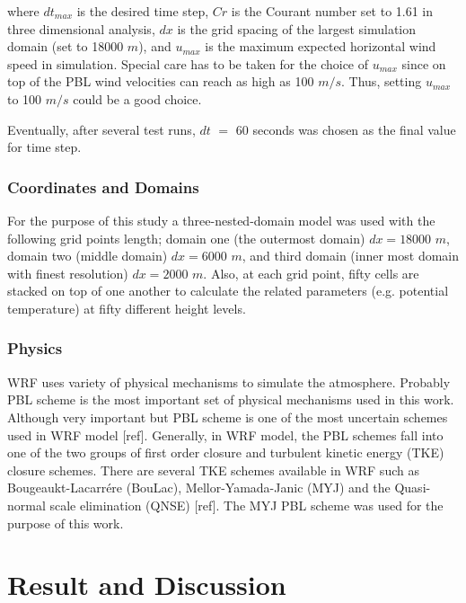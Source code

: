 \documentclass[a4paper,12pt]{article}
\numberwithin{equation}{section} %
\begin{document}
where $dt_{max}$ is the desired time step, $Cr$ is the Courant number set to 1.61 in three dimensional analysis, $dx$ is the grid spacing of the largest simulation domain (set to 18000 $m$), and $u_{max}$ is the maximum expected horizontal wind speed in simulation. Special care has to be taken for the choice of $u_{max}$ since on top of the PBL wind velocities can reach as high as 100 $m/s$. Thus, setting $u_{max}$ to 100 $m/s$ could be a good choice.

\vspace{0.25cm}

Eventually, after several test runs, $dt$ $=$ $60$ seconds was chosen as the final value for time step.

\subsubsection{Coordinates and Domains}
For the purpose of this study a three-nested-domain model was used with the following grid points length; domain one (the outermost domain) $dx = 18000$ $m$, domain two (middle domain) $dx = 6000$ $m$, and third domain (inner most domain with finest resolution) $dx = 2000$ $m$. %
Also, at each grid point, fifty cells are stacked on top of one another to calculate the related parameters (e.g. potential temperature) at fifty different height levels.

\subsubsection{Physics}

WRF uses variety of physical mechanisms to simulate the atmosphere. Probably PBL scheme is the most important set of physical mechanisms used in this work. Although very important but PBL scheme is one of the most uncertain schemes used in WRF model [ref]. Generally, in WRF model, the PBL schemes fall into one of the two groups of 	first order closure and turbulent kinetic energy (TKE) closure schemes. There are several TKE schemes available in WRF such as Bougeaukt-Lacarrére (BouLac), Mellor-Yamada-Janic (MYJ) and the Quasi-normal scale elimination (QNSE) [ref]. The MYJ PBL scheme was used for the purpose of this work.

\newpage

\section{Result and Discussion}
\end{document}

